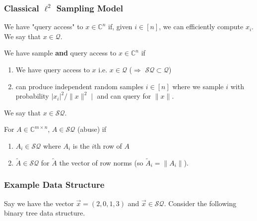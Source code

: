 \documentclass{beamer}
\newcommand\0{\mathbf{0}}
\newcommand\CC{\mathbb{C}}
\newcommand\<{\langle}
\renewcommand\>{\rangle}
\renewcommand\implies{\Rightarrow}
\begin{document}
\begin{frame}
\frametitle{Classical $\ell^2$ Sampling Model}
\begin{definition}
We have "query access" to $x \in \CC^n$ if, given $i \in [n]$, we can efficiently compute $x_i$. We say that $x \in \mathcal{Q}$.
\end{definition}
\begin{definition} We have sample \textbf{and} query access to $x \in \CC^n$ if 

\begin{enumerate}
\item We have query access to $x$ i.e. $x\in \mathcal{Q}$ ($\implies$ $\mathcal{SQ} \subset \mathcal{Q}$)
\item can produce independent random samples $i \in [n]$ where we sample $i$ with probability $|x_i|^2/\|x\|^2∣$ and can query for $\|x\|$.
\end{enumerate}
We say that $x \in \mathcal{SQ}$. 
\end{definition}
\begin{definition} For $A \in \CC^{m\times n}$, $A \in \mathcal{SQ}$ (abuse) if

\begin{enumerate}
\item $A_i \in \mathcal{SQ}$ where $A_i$ is the $i$th row of $A$
\item $\tilde{A} \in \mathcal{SQ}$ for $\tilde{A}$ the vector of row norms (so $\tilde{A}_i = \|A_i\|$).	
\end{enumerate}
 
\end{definition}
\end{frame}

\begin{frame}
\frametitle{Example Data Structure}

Say we have the vector $\vec{x} = (2, 0, 1, 3)$ and $\vec{x} \in \mathcal{SQ}$. Consider the following binary tree data structure.

\end{frame}
\end{document}
